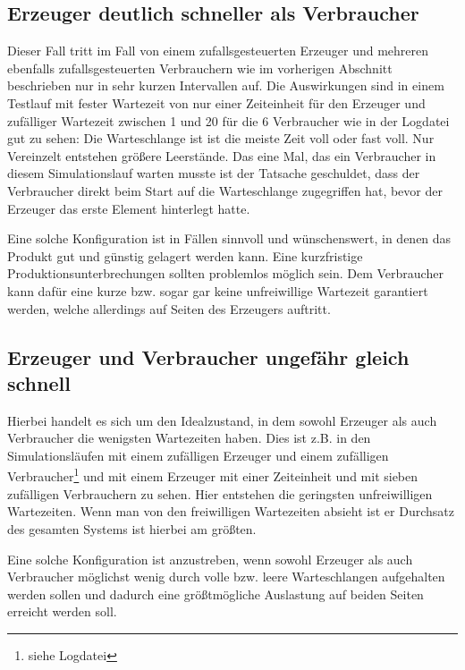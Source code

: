 \subsection{Erzeuger deutlich schneller als Verbraucher} %
\label{sub:erzeuger_schneller_als_verbraucher}
Dieser Fall tritt im Fall von einem zufallsgesteuerten Erzeuger und mehreren ebenfalls zufallsgesteuerten Verbrauchern wie im vorherigen Abschnitt beschrieben nur in sehr kurzen Intervallen auf. Die Auswirkungen sind in einem Testlauf mit fester Wartezeit von nur einer Zeiteinheit für den Erzeuger und zufälliger Wartezeit zwischen 1 und 20 für die 6 Verbraucher wie in der Logdatei  gut zu sehen: Die Warteschlange ist ist die meiste Zeit voll oder fast voll. Nur Vereinzelt entstehen größere Leerstände. Das eine Mal, das ein Verbraucher in diesem Simulationslauf warten musste ist der Tatsache geschuldet, dass der Verbraucher direkt beim Start auf die Warteschlange zugegriffen hat, bevor der Erzeuger das erste Element hinterlegt hatte.

Eine solche Konfiguration ist in Fällen sinnvoll und wünschenswert, in denen das Produkt gut und günstig gelagert werden kann. Eine kurzfristige Produktionsunterbrechungen sollten problemlos möglich sein. Dem Verbraucher kann dafür eine kurze bzw. sogar gar keine unfreiwillige Wartezeit garantiert werden, welche allerdings auf Seiten des Erzeugers auftritt.

\subsection{Erzeuger und Verbraucher ungefähr gleich schnell} %
\label{sub:erzeuger_und_verbraucher_gleich_schnell}
Hierbei handelt es sich um den Idealzustand, in dem sowohl Erzeuger als auch Verbraucher die wenigsten Wartezeiten haben. Dies ist z.B. in den Simulationsläufen mit einem zufälligen Erzeuger und einem zufälligen Verbraucher\footnote{siehe Logdatei } und mit einem Erzeuger mit einer Zeiteinheit und mit sieben zufälligen Verbrauchern zu sehen. Hier entstehen die geringsten unfreiwilligen Wartezeiten. Wenn man von den freiwilligen Wartezeiten absieht ist er Durchsatz des gesamten Systems ist hierbei am größten.

Eine solche Konfiguration ist anzustreben, wenn sowohl Erzeuger als auch Verbraucher möglichst wenig durch volle bzw. leere Warteschlangen aufgehalten werden sollen und dadurch eine größtmögliche Auslastung auf beiden Seiten erreicht werden soll.


